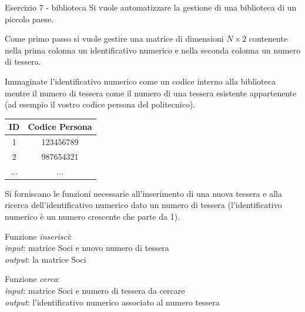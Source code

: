 \documentclass[handout]{beamer}
\begin{document}
	
\begin{frame}[allowframebreaks]{Esercizio 7 - biblioteca}
Si vuole automatizzare la gestione di una biblioteca di un piccolo paese.

Come primo passo si vuole gestire una matrice di dimensioni $N \times 2$ contenente nella
prima colonna un identificativo numerico e nella seconda colonna un numero di
tessera.

Immaginate l’identificativo numerico come un codice interno alla biblioteca mentre il
numero di tessera come il numero di una tessera esistente appartenente (ad esempio
il vostro codice persona del politecnico).

\begin{tabular}{|c|c|}
	\hline
	ID	&	Codice Persona \\
	\hline
	1	&	123456789	\\
	\hline
	2	&	987654321	\\
	\hline
	...	&	... \\
	\hline
\end{tabular} 


Si forniscano le funzioni necessarie all'inserimento di una nuova tessera e alla ricerca
dell'identificativo numerico dato un numero di tessera (l’identificativo numerico è un
numero crescente che parte da 1).

Funzione \emph{inserisci}:\\
\emph{input}: matrice Soci e nuovo numero di tessera\\
\emph{output}: la matrice Soci

Funzione \emph{cerca}:\\
\emph{input}: matrice Soci e numero di tessera da cercare\\
\emph{output}: l’identificativo numerico associato al numero tessera
\end{frame}
\end{document}
